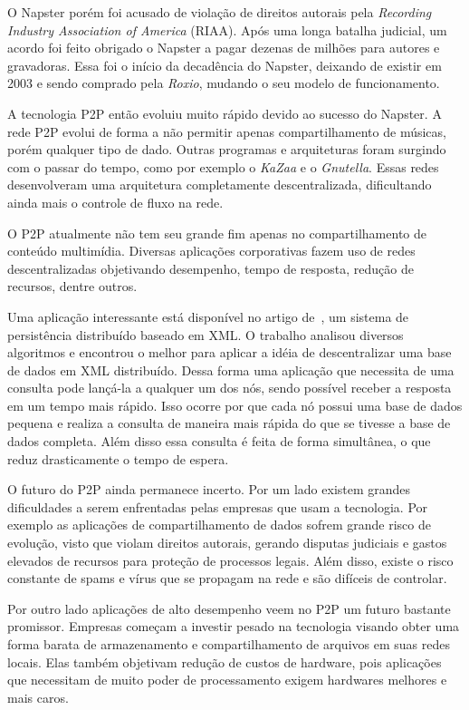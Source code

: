 O Napster porém foi acusado de violação de direitos autorais pela \emph{Recording Industry Association of America} (RIAA). Após uma longa batalha judicial, um acordo foi feito obrigado o Napster a pagar dezenas de milhões para autores e gravadoras. Essa foi o início da decadência do Napster, deixando de existir em 2003 e sendo comprado pela \emph{Roxio}, mudando o seu modelo de funcionamento.

A tecnologia P2P então evoluiu muito rápido devido ao sucesso do Napster. A rede P2P evolui de forma a não permitir apenas compartilhamento de músicas, porém qualquer tipo de dado. Outras programas e arquiteturas foram surgindo com o passar do tempo, como por exemplo o \emph{{K}a{Z}aa} e o \emph{Gnutella}. Essas redes desenvolveram uma arquitetura completamente descentralizada, dificultando ainda mais o controle de fluxo na rede.

O P2P atualmente não tem seu grande fim apenas no compartilhamento de conteúdo multimídia. Diversas aplicações corporativas fazem uso de redes descentralizadas objetivando desempenho, tempo de resposta, redução de recursos, dentre outros.

Uma aplicação interessante está disponível no artigo de~\cite{stilling03}, um sistema de persistência distribuído baseado em XML. O trabalho analisou diversos algoritmos e encontrou o melhor para aplicar a idéia de descentralizar uma base de dados em XML distribuído. Dessa forma uma aplicação que necessita de uma consulta pode lançá-la a qualquer um dos nós, sendo possível receber a resposta em um tempo mais rápido. Isso ocorre por que cada nó possui uma base de dados pequena e realiza a consulta de maneira mais rápida do que se tivesse a base de dados completa. Além disso essa consulta é feita de forma simultânea, o que reduz drasticamente o tempo de espera.

O futuro do P2P ainda permanece incerto. Por um lado existem grandes dificuldades a serem enfrentadas pelas empresas que usam a tecnologia. Por exemplo as aplicações de compartilhamento de dados sofrem grande risco de evolução, visto que violam direitos autorais, gerando disputas judiciais e gastos elevados de recursos para proteção de processos legais. Além disso, existe o risco constante de spams e vírus que se propagam na rede e são difíceis de controlar.

Por outro lado aplicações de alto desempenho veem no P2P um futuro bastante promissor. Empresas começam a investir pesado na tecnologia visando obter uma forma barata de armazenamento e compartilhamento de arquivos em suas redes locais. Elas também objetivam redução de custos de hardware, pois aplicações que necessitam de muito poder de processamento exigem hardwares melhores e mais caros.

